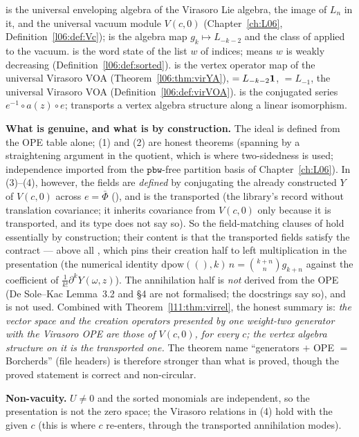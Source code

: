 \begin{dictionary}
 is the universal enveloping algebra of the Virasoro Lie algebra,  the image of $L_n$ in it, and
 the universal vacuum module $V(c,0)$ (Chapter~\ref{ch:L06}, Definition~\ref{l06:def:Vc});  is the algebra
map $g_k\mapsto L_{-k-2}$ and  the class of  applied to the vacuum.  is the word state
of the list $w$ of indices;  means $w$ is weakly decreasing (Definition~\ref{l06:def:sorted}).  is the
vertex operator map of the universal Virasoro VOA (Theorem~\ref{l06:thm:virYA}),  $= L_{-k-2}\mathbf{1}$,
 $= L_{-1}$,  the universal Virasoro VOA (Definition~\ref{l06:def:virVOA}).  is
the conjugated series $e^{-1}\circ a(z)\circ e$;  transports a vertex algebra structure along a linear
isomorphism.

\textbf{What is genuine, and what is by construction.} The ideal  is defined from the OPE table alone;
(1) and (2) are honest theorems (spanning by a straightening argument in the quotient, which is where two-sidedness is used;
independence imported from the $\mathtt{pbw}$-free partition basis of Chapter~\ref{ch:L06}). In (3)--(4), however, the fields are
\emph{defined} by conjugating the already constructed $Y$ of $V(c,0)$ across $e = \bar\Phi$ (), and
 is the transported  (the library's record without translation covariance; it inherits
covariance from $V(c,0)$ only because it is transported, and its type does not say so). So the field-matching clauses of
\allowbreak{}\allowbreak{}\allowbreak{} hold essentially by construction; their content is that the transported fields
satisfy the contract --- above all , which pins their creation half to left multiplication in the presentation (the
numerical identity $\mathrm{dpow}((),k)\,n = \binom{k+n}n g_{k+n}$ against the coefficient of $\frac1{k!}\partial^kY(\omega,z)$). The
annihilation half is \emph{not} derived from the OPE (De Sole--Kac Lemma~3.2 and \S4 are not formalised; the docstrings say so), and
 is not used. Combined with Theorem~\ref{l11:thm:virrel}, the honest summary is: \emph{the vector space and the
creation operators presented by one weight-two generator with the Virasoro OPE are those of $V(c,0)$, for every $c$; the vertex
algebra structure on it is the transported one.} The theorem name ``generators $+$ OPE $=$ Borcherds'' (file headers) is therefore
stronger than what is proved, though the proved statement is correct and non-circular.

\textbf{Non-vacuity.} $U\neq0$ and the sorted monomials are independent, so the presentation is not the zero space; the Virasoro
relations in (4) hold with the given $c$ (this is where $c$ re-enters, through the transported annihilation modes).
\end{dictionary}

